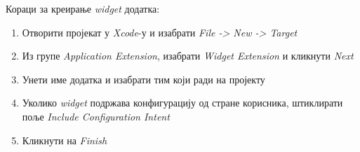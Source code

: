 \documentclass[12pt,oneside]{memoir}
\begin{document}
\indent Кораци за креирање \textit{widget} додатка:
\begin{enumerate}
    \item Отворити пројекат у \textit{Xcode}-у и изабрати \textit{File -> New -> Target}
    
    \item Из групе \textit{Application Extension}, изабрати \textit{Widget Extension} и кликнути \textit{Next}
    
    \item Унети име додатка и изабрати тим који ради на пројекту
    
    \item Уколико \textit{widget} подржава конфигурацију од стране корисника, штиклирати поље \textit{Include Configuration Intent}
    
    \item Кликнути на \textit{Finish}
    
\end{enumerate}
\end{document}
